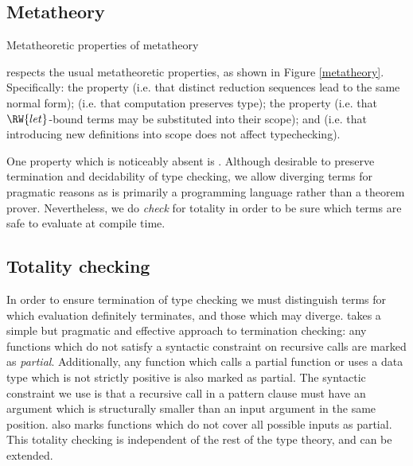 \subsection{Metatheory}

{Metatheoretic properties of \TT{}}
{metatheory}

\TT{} respects the usual metatheoretic properties, as shown in Figure
\ref{metatheory}.  Specifically: the  property
(i.e. that distinct reduction sequences lead to the same normal form); 
 (i.e. that computation preserves type); the  property
(i.e. that $\RW{let}$-bound terms may be substituted into their scope); and
 (i.e. that introducing new definitions into scope does
not affect typechecking).

One property which is noticeably absent is .
Although desirable to preserve termination and decidability of type checking,
we allow diverging terms for pragmatic reasons as \Idris{} is primarily a
programming language rather than a theorem prover. Nevertheless, we do
\emph{check} for totality in order to be sure which terms are safe to
evaluate at compile time.

\subsection{Totality checking}

In order to ensure termination of type checking we must distinguish terms for
which evaluation definitely terminates, and those which may diverge. \TT{}
takes a simple but pragmatic and effective approach to termination checking:
any functions which do not satisfy a syntactic constraint on recursive calls
are marked as \emph{partial}. Additionally, any function which calls a partial
function or uses a data type which is not strictly positive is also marked as
partial. The syntactic constraint we use is that a recursive call in a pattern
clause must have an argument which is structurally smaller than an input
argument in the same position. \TT{} also marks functions which do not cover
all possible inputs as partial. This totality checking is independent of the
rest of the type theory, and can be extended.

